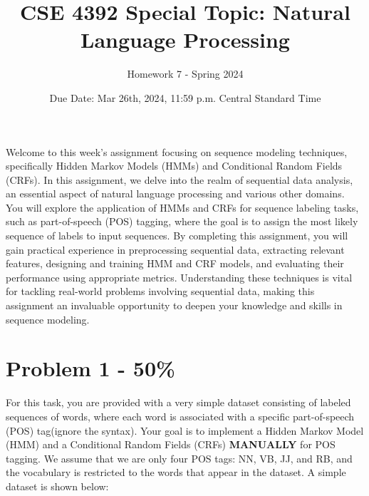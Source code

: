 \documentclass{article}
\begin{document}
\title{CSE 4392 Special Topic: Natural Language Processing}
\author{Homework 7 - Spring 2024}
\date{Due Date: Mar 26th, 2024, 11:59 p.m. Central Standard Time}
\maketitle
\thispagestyle{fancy}


Welcome to this week's assignment focusing on sequence modeling techniques, 
specifically Hidden Markov Models (HMMs) and Conditional Random Fields (CRFs). 
In this assignment, we delve into the realm of sequential data analysis, 
an essential aspect of natural language processing and various other domains. 
You will explore the application of HMMs and CRFs for sequence labeling tasks, 
such as part-of-speech (POS) tagging, 
where the goal is to assign the most likely sequence of labels to input sequences. 
By completing this assignment, 
you will gain practical experience in preprocessing sequential data, 
extracting relevant features, designing and training HMM and CRF models, 
and evaluating their performance using appropriate metrics. 
Understanding these techniques is vital for tackling real-world problems involving sequential data, 
making this assignment an invaluable opportunity to deepen your knowledge and skills in sequence modeling.

\section*{Problem 1 - 50\%}

For this task, you are provided with a very simple dataset consisting of labeled sequences of words, 
where each word is associated with a specific part-of-speech (POS) tag(ignore the syntax). 
Your goal is to implement a Hidden Markov Model (HMM) and a Conditional Random Fields (CRFs) 
\textbf{MANUALLY} for POS tagging. We assume that we are only four
POS tags: NN, VB, JJ, and RB, and the vocabulary is restricted to the words
that appear in the dataset. A simple dataset is shown below:
\end{document}
